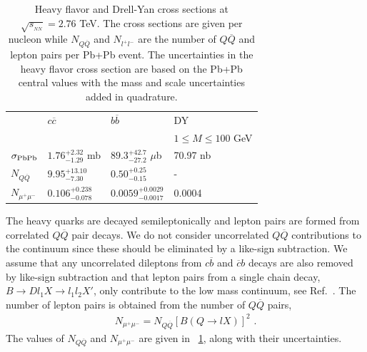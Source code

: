 \begin{table}[bht]
\caption[]{Heavy flavor and Drell-Yan cross sections at 
$\sqrt{s_{_{NN}}}= 2.76$ TeV.  The cross sections are given per nucleon while
$N_{Q \overline Q}$ and $N_{l^+ l^-}$ are the number of $Q \overline Q$ and lepton 
pairs per Pb+Pb event.  The uncertainties in the heavy flavor cross section are
based on the Pb+Pb central values with the mass and scale uncertainties added
in quadrature.}
\label{NLOcros}
\begin{tabular}{llll} 
\hline 
                 & $ c \overline c$  &  $b \overline b$     & DY\\
                 &              &          & $1 \leq M \leq 100$ GeV\\
\hline
$\sigma_{\rm PbPb}$ & $1.76^{+2.32}_{-1.29}$ mb & $89.3^{+42.7}_{-27.2}$ $\mu$b & 70.97 nb \\
$N_{Q\overline Q}$ & $9.95^{+13.10}_{-7.30}$ & $0.50^{+0.25}_{-0.15}$ &  -      \\
$N_{\mu^+\mu^-}$  & $0.106^{+0.238}_{-0.078}$ & $0.0059^{+0.0029}_{-0.0017}$ & 0.0004  \\
\hline
\end{tabular}
\end{table} 

The heavy quarks are decayed semileptonically and lepton pairs are formed
from correlated $Q \overline Q$ pair decays.  We do not consider uncorrelated
$Q \overline Q$ contributions to the continuum since these should be
eliminated by a like-sign subtraction.  We assume that any uncorrelated
dileptons from $c \overline b$ and $\overline c b$ decays are also removed
by like-sign subtraction and that lepton pairs from a single chain decay,
$B\rightarrow D l_1 X \rightarrow l_1 l_2 X'$, only contribute to the low mass
continuum, see Ref.~\cite{LIN2}.  The number of lepton pairs is obtained from
the number of $Q\overline Q$ pairs,
\begin{eqnarray}
N_{\mu^+\mu^-} = N_{Q \overline Q} [B(Q \rightarrow l X)]^2 \, \, .
\end{eqnarray}
The values of $N_{Q \overline Q}$ and $N_{\mu^+ \mu^-}$ are given in 
\Table~\ref{NLOcros}, along with their uncertainties.

